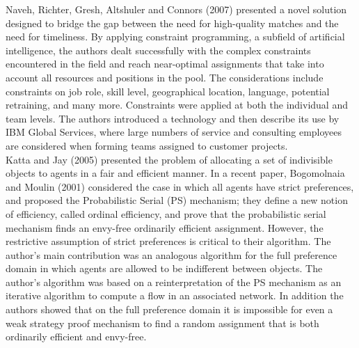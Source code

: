 \documentclass[11pt]{report}
\newcommand{\NI}{\noindent}
\begin{document}
	\NI Naveh, Richter, Gresh, Altshuler and Connors (2007) presented a novel solution designed to bridge the gap between the need for high-quality matches and the need for timeliness. By applying constraint programming, a subfield of artificial intelligence, the authors dealt successfully with the complex constraints encountered in the field and reach near-optimal assignments that take into account all resources and positions in the pool. The considerations include constraints on job role, skill level, geographical location, language, potential retraining, and many more. Constraints were applied at both the individual and team levels. The authors introduced a technology and then describe its use by IBM Global Services, where large numbers of service and consulting employees are considered when forming teams assigned to customer projects.\\
	
	\NI Katta and Jay (2005) presented the problem of allocating a set of indivisible objects to agents in a fair and efficient manner. In a recent paper, Bogomolnaia and Moulin (2001) considered the case in which all agents have strict preferences, and proposed the Probabilistic Serial (PS) mechanism; they define a new notion of efficiency, called ordinal efficiency, and prove that the probabilistic serial mechanism finds an envy-free ordinarily efficient assignment. However, the restrictive assumption of strict preferences is critical to their algorithm. The author’s main contribution was an analogous algorithm for the full preference domain in which agents are allowed to be indifferent between objects. The author’s algorithm was based on a reinterpretation of the PS mechanism as an iterative algorithm to compute a flow in an associated network. In addition the authors showed that on the full preference domain it is impossible for even a weak strategy proof mechanism to find a random assignment that is both ordinarily efficient and envy-free.\\
	
\end{document}

